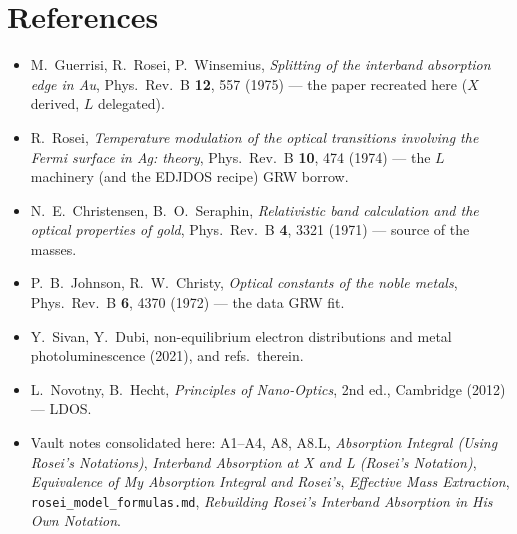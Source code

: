 \documentclass[11pt,a4paper]{article}
\numberwithin{equation}{section}
\begin{document}
\section*{References}
\begin{itemize}
\item M.~Guerrisi, R.~Rosei, P.~Winsemius,
\emph{Splitting of the interband absorption edge in Au},
Phys.\ Rev.\ B \textbf{12}, 557 (1975) --- the paper recreated here
($X$ derived, $L$ delegated).
\item R.~Rosei, \emph{Temperature modulation of the optical
transitions involving the Fermi surface in Ag: theory},
Phys.\ Rev.\ B \textbf{10}, 474 (1974) --- the $L$ machinery (and the
EDJDOS recipe) GRW borrow.
\item N.~E.~Christensen, B.~O.~Seraphin,
\emph{Relativistic band calculation and the optical properties of
gold}, Phys.\ Rev.\ B \textbf{4}, 3321 (1971) --- source of the masses.
\item P.~B.~Johnson, R.~W.~Christy,
\emph{Optical constants of the noble metals},
Phys.\ Rev.\ B \textbf{6}, 4370 (1972) --- the data GRW fit.
\item Y.~Sivan, Y.~Dubi, non-equilibrium electron distributions and
metal photoluminescence (2021), and refs.\ therein.
\item L.~Novotny, B.~Hecht, \emph{Principles of Nano-Optics},
2nd ed., Cambridge (2012) --- LDOS.
\item Vault notes consolidated here: A1--A4, A8, A8.L,
\emph{Absorption Integral (Using Rosei's Notations)},
\emph{Interband Absorption at X and L (Rosei's Notation)},
\emph{Equivalence of My Absorption Integral and Rosei's},
\emph{Effective Mass Extraction}, \texttt{rosei\_model\_formulas.md},
\emph{Rebuilding Rosei's Interband Absorption in His Own Notation}.
\end{itemize}
\end{document}
